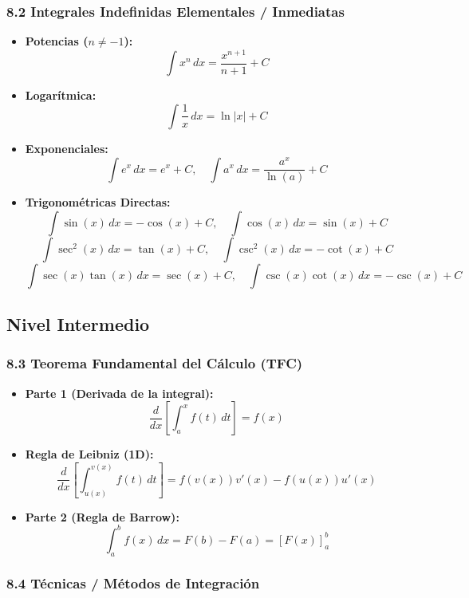 \documentclass[11pt,a4paper]{article}
\begin{document}
\subsubsection*{8.2 Integrales Indefinidas Elementales / Inmediatas}

\begin{itemize}
  \item \textbf{Potencias ($n \ne -1$):}
  \[
    \int x^n \, dx = \frac{x^{n+1}}{n+1} + C
  \]
  \item \textbf{Logarítmica:}
  \[
    \int \frac{1}{x} \, dx = \ln|x| + C
  \]
  \item \textbf{Exponenciales:}
  \[
    \int e^x \, dx = e^x + C, \quad \int a^x \, dx = \frac{a^x}{\ln(a)} + C
  \]
  \item \textbf{Trigonométricas Directas:}
  \[
    \int \sin(x) \, dx = -\cos(x) + C, \quad \int \cos(x) \, dx = \sin(x) + C
  \]
  \[
    \int \sec^2(x) \, dx = \tan(x) + C, \quad \int \csc^2(x) \, dx = -\cot(x) + C
  \]
  \[
    \int \sec(x)\tan(x) \, dx = \sec(x) + C, \quad \int \csc(x)\cot(x) \, dx = -\csc(x) + C
  \]
\end{itemize}

\subsection*{Nivel Intermedio}

\subsubsection*{8.3 Teorema Fundamental del Cálculo (TFC)}

\begin{itemize}
  \item \textbf{Parte 1 (Derivada de la integral):}
  \[
    \frac{d}{dx} \left[ \int_a^x f(t) \, dt \right] = f(x)
  \]
  \item \textbf{Regla de Leibniz (1D):}
  \[
    \frac{d}{dx} \left[ \int_{u(x)}^{v(x)} f(t) \, dt \right] = f(v(x))v'(x) - f(u(x))u'(x)
  \]
  \item \textbf{Parte 2 (Regla de Barrow):}
  \[
    \int_a^b f(x) \, dx = F(b) - F(a) = [F(x)]_a^b
  \]
\end{itemize}

\subsubsection*{8.4 Técnicas / Métodos de Integración}
\end{document}
